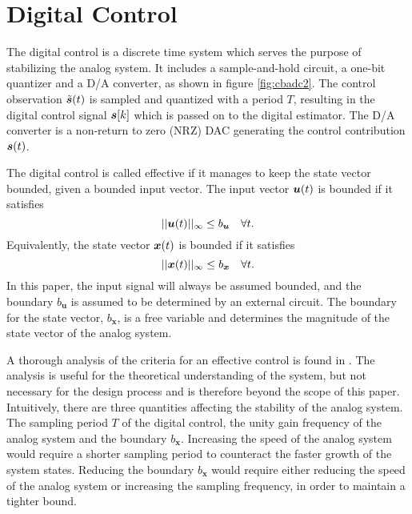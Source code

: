 \section{Digital Control}
\label{sec:04digcontrol}
The digital control is a discrete time system which serves the purpose of stabilizing the analog system. It includes a sample-and-hold circuit, a one-bit quantizer and a D/A converter, as shown in figure \ref{fig:cbadc2}. The control observation $\tilde{\bm{s}}(t)$ is sampled and quantized with a period $T$, resulting in the digital control signal $\bm{s}[k]$ which is passed on to the digital estimator. The D/A converter is a non-return to zero (NRZ) DAC generating the control contribution $\bm{s}(t)$.

The digital control is called effective if it manages to keep the state vector bounded, given a bounded input vector. The input vector $\bm{u}(t)$ is bounded if it satisfies
\begin{equation}
    ||\bm{u}(t)||_{\infty} \leq b_{\bm{u}} \quad \forall t.
\end{equation}
Equivalently, the state vector $\bm{x}(t)$ is bounded if it satisfies
\begin{equation}
    \label{eq:bx}
    ||\bm{x}(t)||_{\infty} \leq b_{\bm{x}} \quad \forall t.
\end{equation}
In this paper, the input signal will always be assumed bounded, and the boundary $b_{\bm{u}}$ is assumed to be determined by an external circuit. The boundary for the state vector, $b_{\bm{x}}$, is a free variable and determines the magnitude of the state vector of the analog system.

A thorough analysis of the criteria for an effective control is found in \cite{malmberg_thesis}. The analysis is useful for the theoretical understanding of the system, but not necessary for the design process and is therefore beyond the scope of this paper. Intuitively, there are three quantities affecting the stability of the analog system. The sampling period $T$ of the digital control, the unity gain frequency of the analog system and the boundary $b_{\bm{x}}$. Increasing the speed of the analog system would require a shorter sampling period to counteract the faster growth of the system states. Reducing the boundary  $b_{\bm{x}}$ would require either reducing the speed of the analog system or increasing the sampling frequency, in order to maintain a tighter bound.

